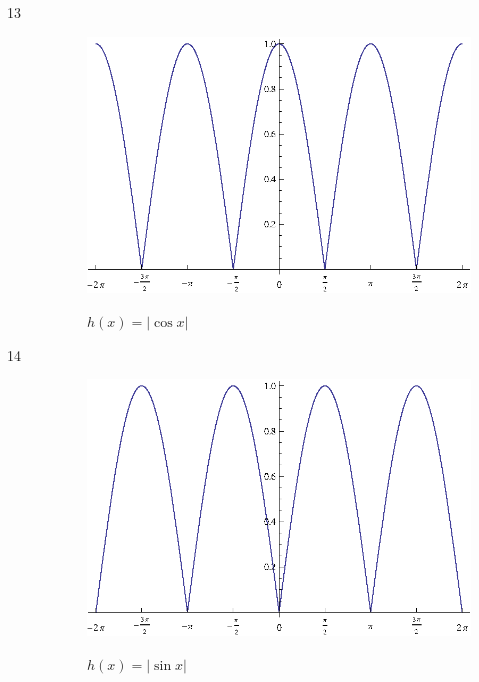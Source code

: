 \documentclass{exam}
\begin{document}
\begin{description}
      \item[13]
        \begin{figure}[H]
          \centering
          \includegraphics[scale=0.9]{exercise13.eps}

          $h(x) = | \cos x |$
        \end{figure}

      \item[14]
        \begin{figure}[H]
          \centering
          \includegraphics[scale=0.9]{exercise14.eps}

          $h(x) = | \sin x |$
        \end{figure}


\end{description}
\end{document}
